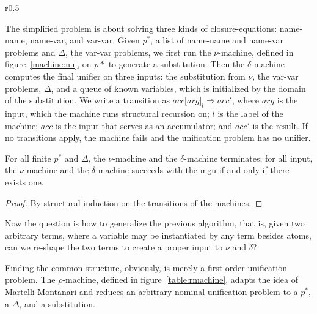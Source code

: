 \documentclass[a4paper,UKenglish]{lipics-v2016}
\newcommand{\machineframe}[4] {
  #1 \lbrack #2 \rbrack_#3 \Rightarrow #4
}
\begin{document}
\begin{wrapfigure}{r}{0.5\textwidth}
\begin{minipage}[b]{0.4\textwidth}
  \end{minipage}
  \end{wrapfigure}

The simplified problem is about solving three kinds of closure-equations:
name-name, name-var, and var-var.
Given $p^*$, a list of name-name and name-var problems and $\Delta$, the var-var problems,
we first run the $\nu$-machine, defined in figure~\ref{machine:nu}, on $p*$ to generate a substitution.
Then the $\delta$-machine computes the final unifier on three inputs:
the substitution from $\nu$,
the var-var problems, $\Delta$,
and a queue of known variables, which is initialized by the domain of the substitution.
We write a transition as $\machineframe{acc}{arg}{l}{acc'}$,
where $arg$ is the input, which the machine runs structural recursion on;
$l$ is the label of the machine;
$acc$ is the input that serves as an accumulator;
and $acc'$ is the result.
If no transitions apply, the machine fails and the unification problem has no unifier.


  \begin{lemma}\label{lemma:numachine}
 For all finite $p^*$ and $\Delta$, the $\nu$-machine and the $\delta$-machine terminates;
    for all input, the $\nu$-machine and the $\delta$-machine succeeds with the mgu
    if and only if there exists one.
    \end{lemma}
    \begin{proof}
     By structural induction on the transitions of the machines.
    \end{proof}

    Now the question is how to generalize the previous algorithm, that is,
    given two arbitrary terms, where a variable may be instantiated by any term besides atoms,
    can we re-shape the two terms to create a proper input to $\nu$ and $\delta$?

    Finding the common structure, obviously, is merely a first-order unification problem.
    The $\rho$-machine, defined in figure~\ref{table:rmachine}, adapts the idea of Martelli-Montanari
    and reduces an arbitrary nominal unification problem to a $p^*$, a $\Delta$, and a substitution.
\end{document}
